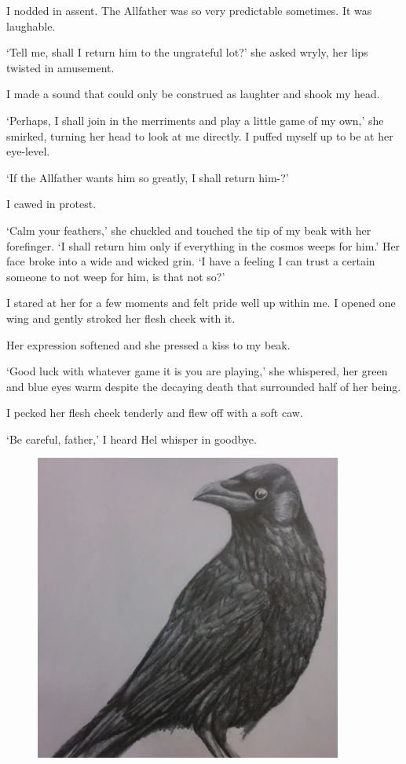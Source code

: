 
I nodded in assent. The Allfather was so very predictable sometimes. It was laughable.

`Tell me, shall I return him to the ungrateful lot?' she asked wryly, her lips twisted in amusement.

I made a sound that could only be construed as laughter and shook my head. 

`Perhaps, I shall join in the merriments and play a little game of my own,' she smirked, turning her head to look at me directly. I puffed myself up to be at her eye-level.

`If the Allfather wants him so greatly, I shall return him-?'

I cawed in protest.

`Calm your feathers,' she chuckled and touched the tip of my beak with her forefinger. `I shall return him only if everything in the cosmos weeps for him.' Her face broke into a wide and wicked grin. `I have a feeling I can trust a certain someone to not weep for him, is that not so?'

I stared at her for a few moments and felt pride well up within me. I opened one wing and gently stroked her flesh cheek with it.

Her expression softened and she pressed a kiss to my beak. 

`Good luck with whatever game it is you are playing,' she whispered, her green and blue eyes warm despite the decaying death that surrounded half of her being.

I pecked her flesh cheek tenderly and flew off with a soft caw.

`Be careful, father,' I heard Hel whisper in goodbye\footnotemark[2].

\begin{figure}[h!]
\centering
\includegraphics[width=0.9\textwidth]{./pictures/raven}
\end{figure}